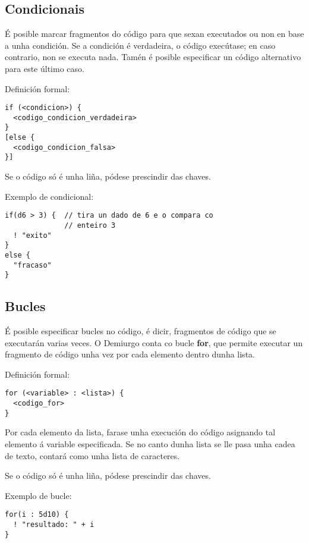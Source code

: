 \subsection{Condicionais}
É posible marcar fragmentos do código para que sexan executados ou non en base a
unha condición. Se a condición é verdadeira, o código execútase; en caso
contrario, non se executa nada. Tamén é posible especificar un código
alternativo para este último caso.
\par Definición formal:
\begin{lstlisting}
if (<condicion>) {
  <codigo_condicion_verdadeira>
}
[else {
  <codigo_condicion_falsa>
}]
\end{lstlisting}
\par Se o código só é unha liña, pódese prescindir das chaves.
\par Exemplo de condicional:
\begin{lstlisting}
if(d6 > 3) {  // tira un dado de 6 e o compara co
              // enteiro 3
  ! "exito"
}
else {
  "fracaso"
}
\end{lstlisting}

\subsection{Bucles}
É posible especificar bucles no código, é dicir, fragmentos de código que se
executarán varias veces. O Demiurgo conta co bucle {\bf for}, que permite
executar un fragmento de código unha vez por cada elemento dentro dunha lista.
\par Definición formal:
\begin{lstlisting}
for (<variable> : <lista>) {
  <codigo_for>
}
\end{lstlisting}
\par Por cada elemento da lista, farase unha execución do código asignando tal
elemento á variable especificada. Se no canto dunha lista se lle pasa unha cadea
de texto, contará como unha lista de caracteres.
\par Se o código só é unha liña, pódese prescindir das chaves.
\par Exemplo de bucle:
\begin{lstlisting}
for(i : 5d10) {
  ! "resultado: " + i
}
\end{lstlisting}

